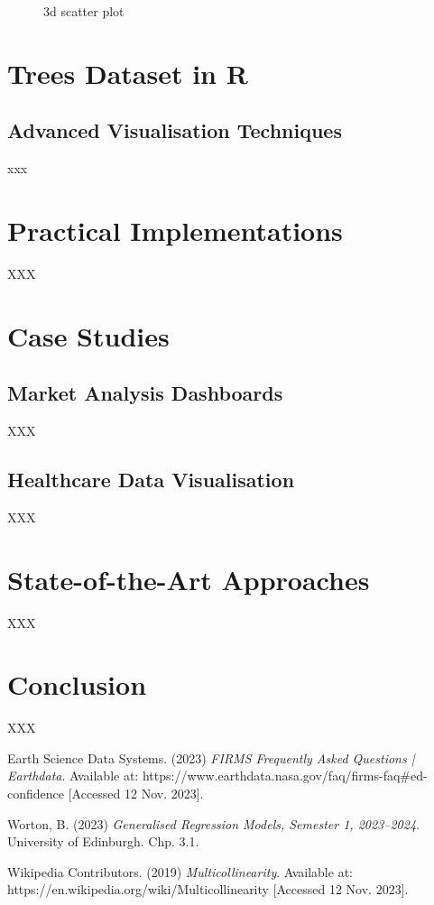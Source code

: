 \documentclass{article}\usepackage[]{graphicx}\usepackage[]{xcolor}
\newenvironment{knitrout}{}{} %
\begin{document}
\begin{knitrout}
\begin{figure}[H]
{}

\caption[3d scatter plot]{3d scatter plot}\label{fig:3d1}
\end{figure}

\end{knitrout}



\section{Trees Dataset in R}



\subsection{Advanced Visualisation Techniques}
xxx




\section{Practical Implementations}
XXX




\section{Case Studies}
\subsection{Market Analysis Dashboards}
XXX
\subsection{Healthcare Data Visualisation}
XXX




\section{State-of-the-Art Approaches}
XXX


\section{Conclusion}

XXX

\begin{thebibliography}{9} %
Earth Science Data Systems. (2023) \textit{FIRMS Frequently Asked Questions | Earthdata}. Available at: https://www.earthdata.nasa.gov/faq/firms-faq#ed-confidence [Accessed 12 Nov. 2023].

Worton, B. (2023) \textit{Generalised Regression Models, Semester 1, 2023–2024}. University of Edinburgh. Chp. 3.1.

Wikipedia Contributors. (2019) \textit{Multicollinearity}. Available at: https://en.wikipedia.org/wiki/Multicollinearity [Accessed 12 Nov. 2023].

\end{thebibliography}
\end{document}
